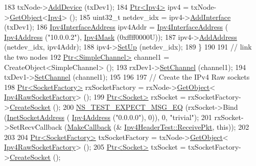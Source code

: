 \begin{DoxyCode}
183     txNode->\hyperlink{classns3_1_1Node_a42ff83ee1d5d1649c770d3f5b62375de}{AddDevice} (txDev1);
184     \hyperlink{classns3_1_1Ptr}{Ptr<Ipv4>} ipv4 = txNode->\hyperlink{classns3_1_1Object_a13e18c00017096c8381eb651d5bd0783}{GetObject}<\hyperlink{classns3_1_1Ipv4}{Ipv4}> ();
185     uint32\_t netdev\_idx = ipv4->\hyperlink{classns3_1_1Ipv4_a637354128b71bc587ea5a6eeaef42469}{AddInterface} (txDev1);
186     \hyperlink{classns3_1_1Ipv4InterfaceAddress}{Ipv4InterfaceAddress} ipv4Addr = \hyperlink{classns3_1_1Ipv4InterfaceAddress}{Ipv4InterfaceAddress} (
      \hyperlink{classns3_1_1Ipv4Address}{Ipv4Address} (\textcolor{stringliteral}{"10.0.0.2"}), \hyperlink{classns3_1_1Ipv4Mask}{Ipv4Mask} (0xffff0000U));
187     ipv4->\hyperlink{classns3_1_1Ipv4_ad203526cae6a4b86f1bb89e44d2b62f7}{AddAddress} (netdev\_idx, ipv4Addr);
188     ipv4->\hyperlink{classns3_1_1Ipv4_a71b2f8acca4923aef907b50b3196bf23}{SetUp} (netdev\_idx);
189   \}
190 
191   \textcolor{comment}{// link the two nodes}
192   \hyperlink{classns3_1_1Ptr}{Ptr<SimpleChannel>} channel1 = CreateObject<SimpleChannel> ();
193   rxDev1->\hyperlink{classns3_1_1SimpleNetDevice_af9e9828ad584b5ba538f18f645f162e0}{SetChannel} (channel1);
194   txDev1->\hyperlink{classns3_1_1SimpleNetDevice_af9e9828ad584b5ba538f18f645f162e0}{SetChannel} (channel1);
195 
196 
197   \textcolor{comment}{// Create the IPv4 Raw sockets}
198   \hyperlink{classns3_1_1Ptr}{Ptr<SocketFactory>} rxSocketFactory = rxNode->\hyperlink{classns3_1_1Object_a13e18c00017096c8381eb651d5bd0783}{GetObject}<
      \hyperlink{classns3_1_1Ipv4RawSocketFactory}{Ipv4RawSocketFactory}> ();
199   \hyperlink{classns3_1_1Ptr}{Ptr<Socket>} rxSocket = rxSocketFactory->\hyperlink{classns3_1_1SocketFactory_a97351e6e7860503a4912042530449f62}{CreateSocket} ();
200   \hyperlink{group__testing_ga7304ba46a28d8cf08dfdfd6499cf7068}{NS\_TEST\_EXPECT\_MSG\_EQ} (rxSocket->Bind (\hyperlink{classns3_1_1InetSocketAddress}{InetSocketAddress} (
      \hyperlink{classns3_1_1Ipv4Address}{Ipv4Address} (\textcolor{stringliteral}{"0.0.0.0"}), 0)), 0, \textcolor{stringliteral}{"trivial"});
201   rxSocket->SetRecvCallback (\hyperlink{group__makecallbackmemptr_ga9376283685aa99d204048d6a4b7610a4}{MakeCallback} (&
      \hyperlink{classIpv4HeaderTest_ae06256e56359912140540a0c04c7dc78}{Ipv4HeaderTest::ReceivePkt}, \textcolor{keyword}{this}));
202 
203 
204   \hyperlink{classns3_1_1Ptr}{Ptr<SocketFactory>} txSocketFactory = txNode->\hyperlink{classns3_1_1Object_a13e18c00017096c8381eb651d5bd0783}{GetObject}<
      \hyperlink{classns3_1_1Ipv4RawSocketFactory}{Ipv4RawSocketFactory}> ();
205   \hyperlink{classns3_1_1Ptr}{Ptr<Socket>} txSocket = txSocketFactory->\hyperlink{classns3_1_1SocketFactory_a97351e6e7860503a4912042530449f62}{CreateSocket} ();

\end{DoxyCode}
